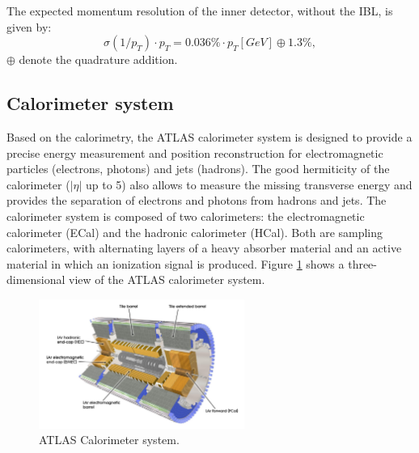 The expected momentum resolution of the inner detector, without the IBL, is given by:
\begin{equation}
    \sigma(1/p_T)\cdot p_T = 0.036\%\cdot p_T [GeV] \oplus 1.3\%,
\end{equation}
$\oplus$ denote the quadrature addition.

\subsection{Calorimeter system}
\label{chap2:ATLAS:Calo}
Based on the calorimetry, the ATLAS calorimeter system is designed to provide a precise energy measurement and position reconstruction for electromagnetic particles (electrons, photons) and jets (hadrons). The good hermiticity of the calorimeter ($|\eta|$ up to 5) also allows to measure the missing transverse energy and provides the separation of electrons and photons from hadrons and jets. The calorimeter system is composed of two calorimeters: the electromagnetic calorimeter (ECal) and the hadronic calorimeter (HCal). Both are sampling calorimeters, with alternating layers of a heavy absorber material and an active material in which an ionization signal is produced. Figure \ref{fig:chap2:ATLAS:Calo} shows a three-dimensional view of the ATLAS calorimeter system.
\begin{figure}[htbp]
    \centering
    \includegraphics[width=0.6\textwidth]{Ch2/Img/Calo.png}
    \caption{ATLAS Calorimeter system.}
    \label{fig:chap2:ATLAS:Calo}
\end{figure}

